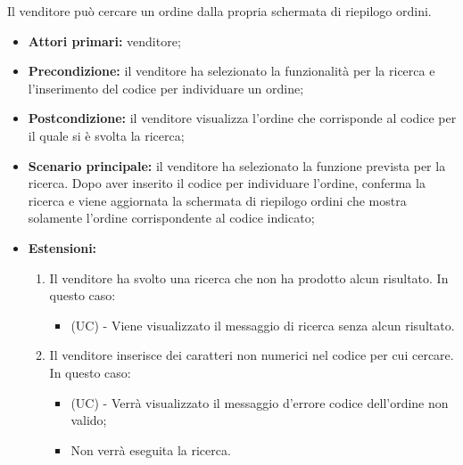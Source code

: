 Il venditore può cercare un ordine dalla propria schermata di riepilogo ordini.
\begin{itemize}
	\item \textbf{Attori primari:} venditore;
	\item \textbf{Precondizione:} il venditore ha selezionato la funzionalità per la ricerca e l'inserimento del codice per individuare un ordine;
	\item \textbf{Postcondizione:} il venditore visualizza l'ordine che corrisponde al codice per il quale si è svolta la ricerca;
	\item \textbf{Scenario principale:} il venditore ha selezionato la funzione prevista per la ricerca. Dopo aver inserito il codice per individuare l'ordine, conferma la ricerca e viene aggiornata la schermata di riepilogo ordini che mostra solamente l'ordine corrispondente al codice indicato;
	\item \textbf{Estensioni:}
	\begin{enumerate}[label=\lett]
		\item Il venditore ha svolto una ricerca che non ha prodotto alcun risultato. In questo caso:
		\begin{itemize}
			\item (UC) - Viene visualizzato il messaggio di ricerca senza alcun risultato.
		\end{itemize}
		\item Il venditore inserisce dei caratteri non numerici nel codice per cui cercare. In questo caso:
		\begin{itemize}
			\item (UC) - Verrà visualizzato il messaggio d'errore codice dell'ordine non valido;
			\item Non verrà eseguita la ricerca.
		\end{itemize}
	\end{enumerate}
\end{itemize}

